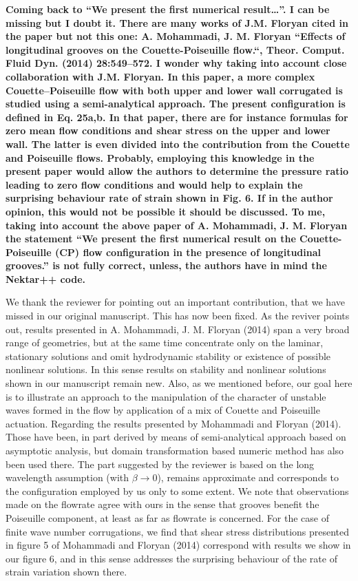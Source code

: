 \documentclass[a4paper,12pt]{article}
\begin{document}
{\bf Coming back to “We present the first numerical result…”. I can be missing but I doubt it. There are many works of J.M. Floryan cited in the paper but not this one: A. Mohammadi, J. M. Floryan “Effects of longitudinal grooves on the Couette-Poiseuille flow.“, Theor. Comput. Fluid Dyn. (2014) 28:549–572. I wonder why taking into account close collaboration with J.M. Floryan. In this paper, a more complex Couette–Poiseuille flow with both upper and lower wall corrugated is studied using a semi-analytical approach. The present configuration is defined in Eq. 25a,b. In that paper, there are for instance formulas for zero mean flow conditions and shear stress on the upper and lower wall. The latter is even divided into the contribution from the Couette and Poiseuille flows. Probably, employing this knowledge in the present paper would allow the authors to determine the pressure ratio leading to zero flow conditions and would help to explain the surprising behaviour rate of strain shown in Fig. 6. If in the author opinion, this would not be possible it should be discussed. To me, taking into account the above paper of A. Mohammadi, J. M. Floryan the statement “We present the first numerical result on the Couette-Poiseuille (CP) flow configuration in the presence of longitudinal grooves.” is not fully correct, unless, the authors have in mind the Nektar++ code.}

\vspace*{20pt}
We thank the reviewer for pointing out an important contribution, that we have missed in our original manuscript. This has now been fixed. As the reviver points out, results presented in A. Mohammadi, J. M. Floryan (2014) span a very broad range of geometries, but at the same time concentrate only on the laminar, stationary solutions and omit hydrodynamic stability or existence of possible nonlinear solutions. In this sense results on stability and nonlinear solutions shown in our manuscript remain new. Also, as we mentioned before, our goal here is to illustrate an approach to the manipulation of the character of unstable waves formed in the flow by application of a mix of Couette and Poiseuille actuation. 
Regarding the results presented by Mohammadi and Floryan (2014). Those have been, in part derived by means of semi-analytical approach based on asymptotic analysis, but domain transformation based numeric method has also been used there. The part suggested by the reviewer is based on the long wavelength assumption (with $\beta\to0$), remains approximate and corresponds to the configuration employed by us only to some extent. We note that observations made on the flowrate agree with ours in the sense that grooves benefit the Poiseuille component, at least as far as flowrate is concerned. For the case of finite wave number corrugations, we find that shear stress distributions presented in figure 5 of Mohammadi and Floryan (2014) correspond with results we show in our figure 6, and in this sense addresses the surprising behaviour of the rate of strain variation shown there. 
\vspace*{20pt}
\end{document}
